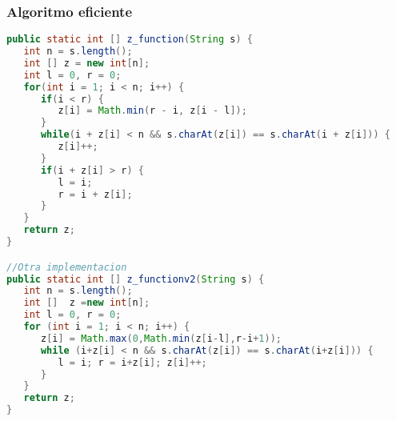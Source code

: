 \subsubsection{Algoritmo eficiente}
\begin{lstlisting}[language=Java]
public static int [] z_function(String s) {
   int n = s.length();
   int [] z = new int[n];
   int l = 0, r = 0;
   for(int i = 1; i < n; i++) {
      if(i < r) {
         z[i] = Math.min(r - i, z[i - l]);
      }
      while(i + z[i] < n && s.charAt(z[i]) == s.charAt(i + z[i])) {
         z[i]++;
      }
      if(i + z[i] > r) {
         l = i;
         r = i + z[i];
      }
   }
   return z;
}

//Otra implementacion
public static int [] z_functionv2(String s) {
   int n = s.length();
   int []  z =new int[n];
   int l = 0, r = 0;
   for (int i = 1; i < n; i++) {
      z[i] = Math.max(0,Math.min(z[i-l],r-i+1));
      while (i+z[i] < n && s.charAt(z[i]) == s.charAt(i+z[i])) {
         l = i; r = i+z[i]; z[i]++;
      }
   }
   return z;
}
\end{lstlisting} 